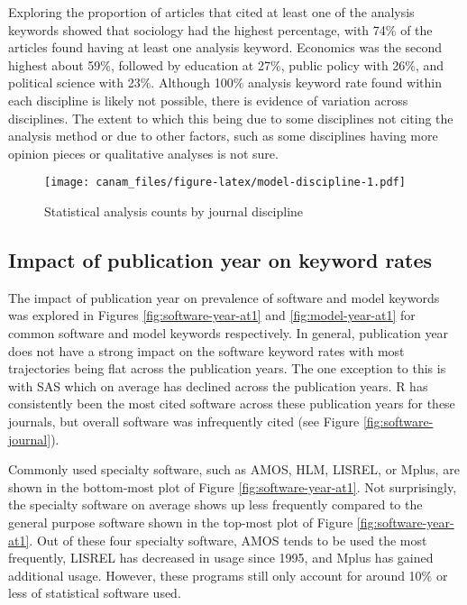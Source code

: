 \documentclass[
  english,
  ,man]{apa6}
\begin{document}
Exploring the proportion of articles that cited at least one of the analysis keywords showed that sociology had the highest percentage, with 74\% of the articles found having at least one analysis keyword. Economics was the second highest about 59\%, followed by education at 27\%, public policy with 26\%, and political science with 23\%. Although 100\% analysis keyword rate found within each discipline is likely not possible, there is evidence of variation across disciplines. The extent to which this being due to some disciplines not citing the analysis method or due to other factors, such as some disciplines having more opinion pieces or qualitative analyses is not sure.

\begin{figure}
\centering
\texttt{[image: canam\_files/figure-latex/model-discipline-1.pdf]}
\caption{\label{fig:model-discipline}Statistical analysis counts by journal discipline}
\end{figure}

\hypertarget{impact-of-publication-year-on-keyword-rates}{%
\subsection{Impact of publication year on keyword rates}\label{impact-of-publication-year-on-keyword-rates}}

The impact of publication year on prevalence of software and model keywords was explored in Figures \ref{fig:software-year-at1} and \ref{fig:model-year-at1} for common software and model keywords respectively. In general, publication year does not have a strong impact on the software keyword rates with most trajectories being flat across the publication years. The one exception to this is with SAS which on average has declined across the publication years. R has consistently been the most cited software across these publication years for these journals, but overall software was infrequently cited (see Figure \ref{fig:software-journal}).

Commonly used specialty software, such as AMOS, HLM, LISREL, or Mplus, are shown in the bottom-most plot of Figure \ref{fig:software-year-at1}. Not surprisingly, the specialty software on average shows up less frequently compared to the general purpose software shown in the top-most plot of Figure \ref{fig:software-year-at1}. Out of these four specialty software, AMOS tends to be used the most frequently, LISREL has decreased in usage since 1995, and Mplus has gained additional usage. However, these programs still only account for around 10\% or less of statistical software used.
\end{document}
